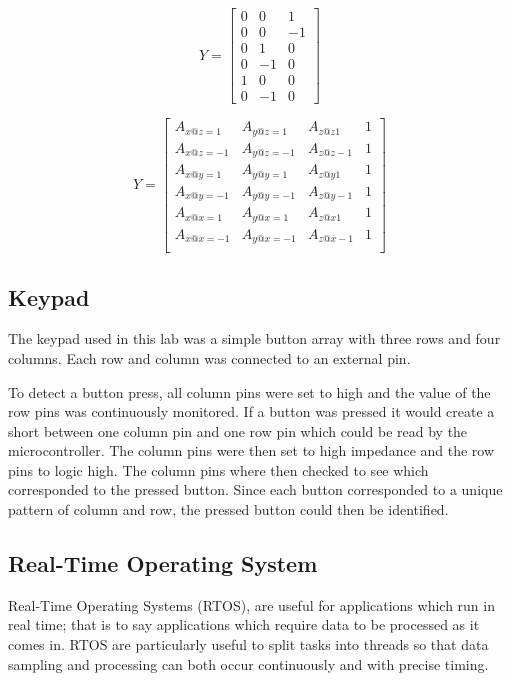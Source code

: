 \documentclass[12pt]{article}
\begin{document}
\begin{equation} \label{cal_eq:3}
 Y = \begin{bmatrix} 0 & 0 & 1  \\
					  0 & 0 & -1 \\
                      0 & 1 & 0  \\
                      0 & -1 & 0 \\
                      1 & 0 & 0  \\
                      0 & -1 & 0
                      \end{bmatrix}
\end{equation}
                      
\begin{equation} \label{cal_eq:4}
 Y = \begin{bmatrix} A_{x@z=1} & A_{y@z=1} & A_{z@z1} & 1 \\
					  A_{x@z=-1} & A_{y@z=-1} & A_{z@z-1} & 1 \\
                      A_{x@y=1} & A_{y@y=1} & A_{z@y1} & 1 \\
                      A_{x@y=-1} & A_{y@y=-1} & A_{z@y-1} & 1 \\
                      A_{x@x=1} & A_{y@x=1} & A_{z@x1} & 1 \\
                      A_{x@x=-1} & A_{y@x=-1} & A_{z@x-1} & 1 \\
                      \end{bmatrix}
\end{equation}
\subsection{Keypad}
The keypad used in this lab was a simple button array with three rows and four columns. Each row and column was connected to an external pin.


To detect a button press, all column pins were set to high and the value of the row pins was continuously monitored. If a button was pressed it would create a short between one column pin and one row pin which could be read by the microcontroller. The column pins were then set to high impedance and the row pins to logic high. The column pins where then checked to see which corresponded to the pressed button. Since each button corresponded to a unique pattern of column and row, the pressed button could then be identified.
\subsection{Real-Time Operating System}
Real-Time Operating Systems (RTOS), are useful for applications which run in real time; that is to say applications which require data to be processed as it comes in. RTOS are particularly useful to split tasks into threads so that data sampling and processing can both occur continuously and with precise timing.
\end{document}
